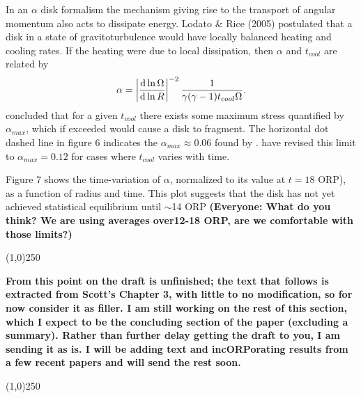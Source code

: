 \documentclass[manuscript]{aastex} %
\begin{document}
In an $\alpha$ disk formalism the mechanism giving rise to the transport of angular momentum also acts to dissipate energy. Lodato \& Rice (2005) postulated that a disk in a state of gravitoturbulence would have locally balanced heating and cooling rates. If the heating were due to local dissipation, then $\alpha$ and $t_{cool}$ are related by
\begin{equation}
\alpha = \left| \frac{{\rm d}\ln \Omega}{{\rm d} \ln R} \right|^{-2}
\frac{1}{\gamma(\gamma - 1) t_{cool}\Omega}.
\end{equation}
\citet{rice2005} concluded that for a given $t_{cool}$  there exists some maximum stress quantified by $\alpha_{max}$, which if exceeded would cause a disk to fragment. The horizontal dot dashed line in figure 6 indicates the $\alpha_{max} \approx 0.06$ found by \citeauthor{rice2005}. \citet{clarke2007} have revised this limit to $\alpha_{max} = 0.12$ for cases where $t_{cool}$  varies with time. 

Figure 7 shows the time-variation of $\alpha$, normalized to its value at $t = 18$ ORP), as a function of radius and  time.  This plot suggests that the disk has not yet achieved statistical equilibrium until $\sim $14 ORP {\bf (Everyone:  What do you think?  We are using averages over12-18 ORP,
are we comfortable with those limits?)}

\begin{center}
\line(1,0){250}
\end{center}

{\bf From this point on the draft is unfinished; the text that follows is extracted from 
Scott's Chapter 3, with little to no modification, so for now consider it as filler.   
I am still working on the rest of this section, which I expect to be the concluding section
of the paper (excluding a summary).  Rather than further delay getting
the draft to you, I am sending it as is.   I will be adding text and incORPorating results from a 
few recent papers and will send the rest soon.}

\begin{center}
\line(1,0){250}
\end{center}
\end{document}
